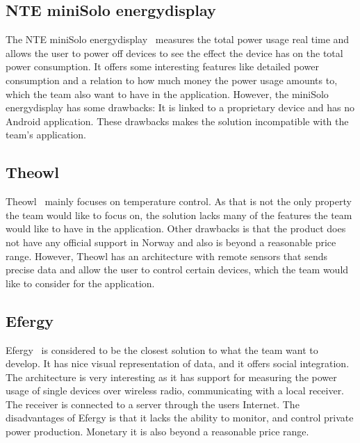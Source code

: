 \subsection{NTE miniSolo energydisplay}

The NTE miniSolo energydisplay~\cite{nte} measures the total power usage real time and allows the user to power off devices to see the effect the device has on the total power consumption. It offers some interesting features like detailed power consumption and a relation to how much money the power usage amounts to, which the team also want to have in the application. However, the miniSolo energydisplay has some drawbacks: It is linked to a proprietary device and has no Android application. These drawbacks makes the solution incompatible with the team's application.



\subsection{Theowl}

Theowl~\cite{theowl} mainly focuses on temperature control. 
As that is not the only property the team would like to focus on, the solution lacks many of the features the team would like to have in the application. Other drawbacks is that the product does not have any official support in Norway and also is beyond a reasonable price range. However, Theowl has an architecture with remote sensors that sends precise data and allow the user to control certain devices, which the team would like to consider for the application.


\subsection{Efergy}

Efergy~\cite{efergy} is considered to be the closest solution to what the team want to develop. It has nice visual representation of data, and it offers social integration. The architecture is very interesting as it has support for measuring the power usage of single devices over wireless radio, communicating with a local receiver. The receiver is connected to a server through the users Internet. The disadvantages of Efergy is that it lacks the ability to monitor, and control private power production. Monetary it is also beyond a reasonable price range.


